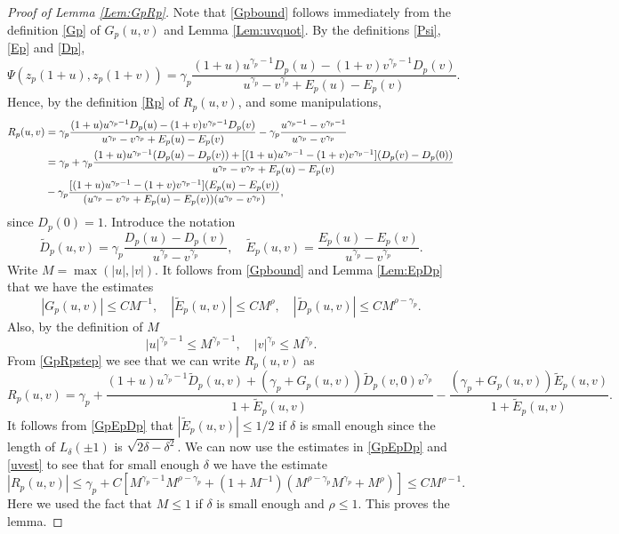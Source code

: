 \documentclass{article}
\numberwithin{equation}{section}
\numberwithin{figure}{section}
\theoremstyle{plain}
\theoremstyle{plain}
\numberwithin{thm}{section}
\theoremstyle{remark}
\let \le \leqslant
\begin{document}
\begin{proof}[Proof of Lemma \ref{Lem:GpRp}]
Note that \eqref{Gpbound} follows immediately from the definition \eqref{Gp} of $G_p(u,v)$ and Lemma \ref{Lem:uvquot}. By the definitions \eqref{Psi},
\eqref{Ep} and \eqref{Dp},
\begin{equation*}
\Psi(z_p(1+u),z_p(1+v))=\gamma_p\frac{(1+u)u^{\gamma_p-1}D_p(u)-(1+v)v^{\gamma_p-1}D_p(v)}{u^{\gamma_p}-v^{\gamma_p}+E_p(u)-E_p(v)}.
\end{equation*}
Hence, by the definition \eqref{Rp} of $R_p(u,v)$, and some manipulations,
\begin{align}\label{GpRpstep}
R_p(u,v)&=\gamma_p\frac{(1+u)u^{\gamma_p-1}D_p(u)-(1+v)v^{\gamma_p-1}D_p(v)}{u^{\gamma_p}-v^{\gamma_p}+E_p(u)-E_p(v)}
-\gamma_p\frac{u^{\gamma_p-1}-v^{\gamma_p-1}}{u^{\gamma_p}-v^{\gamma_p}}\notag\\
&=\gamma_p+\gamma_p\frac{(1+u)u^{\gamma_p-1}(D_p(u)-D_p(v))+[(1+u)u^{\gamma_p-1}-(1+v)v^{\gamma_p-1}](D_p(v)-D_p(0))}{u^{\gamma_p}-v^{\gamma_p}+E_p(u)-E_p(v)}
\notag\\
&-\gamma_p\frac{[(1+u)u^{\gamma_p-1}-(1+v)v^{\gamma_p-1}](E_p(u)-E_p(v))}{(u^{\gamma_p}-v^{\gamma_p}+E_p(u)-E_p(v))(u^{\gamma_p}-v^{\gamma_p})},
\end{align}
since $D_p(0)=1$. Introduce the notation
\begin{equation*}
\tilde{D}_p(u,v)=\gamma_p\frac{D_p(u)-D_p(v)}{u^{\gamma_p}-v^{\gamma_p}},\quad \tilde{E}_p(u,v)=\frac{E_p(u)-E_p(v)}{u^{\gamma_p}-v^{\gamma_p}}.
\end{equation*}
Write $M=\max(|u|,|v|)$. It follows from \eqref{Gpbound} and Lemma \ref{Lem:EpDp} that we have the estimates
\begin{equation}\label{GpEpDp}
|G_p(u,v)|\le CM^{-1},\quad |\tilde{E}_p(u,v)|\le CM^{\rho}, \quad |\tilde{D}_p(u,v)|\le CM^{\rho-\gamma_p}.
\end{equation}
Also, by the definition of $M$
\begin{equation}\label{uvest}
|u|^{\gamma_p-1}\le M^{\gamma_p-1}, \quad |v|^{\gamma_p}\le M^{\gamma_p}.
\end{equation}
From \eqref{GpRpstep} we see that we can write $R_p(u,v)$ as
\begin{equation*}
R_p(u,v)=\gamma_p+\frac{(1+u)u^{\gamma_p-1}\tilde{D}_p(u,v)+(\gamma_p+G_p(u,v))\tilde{D}_p(v,0)v^{\gamma_p}}{1+\tilde{E}_p(u,v)}
-\frac{(\gamma_p+G_p(u,v))\tilde{E}_p(u,v)}{1+\tilde{E}_p(u,v)}.
\end{equation*}
It follows from \eqref{GpEpDp} that $|\tilde{E}_p(u,v)|\le 1/2$ if $\delta$ is small enough since the length of $L_\delta(\pm 1)$ is $\sqrt{2\delta-\delta^2}$. We
can now use the estimates in \eqref{GpEpDp} and \eqref{uvest} to see that for small enough $\delta$ we have the estimate
\begin{equation*}
|R_p(u,v)|\le \gamma_p+C[M^{\gamma_p-1}M^{\rho-\gamma_p}+(1+M^{-1})(M^{\rho-\gamma_p}M^{\gamma_p}+M^\rho)]\le CM^{\rho-1}.
\end{equation*}
Here we used the fact that $M\le 1$ if $\delta$ is small enough and $\rho\le 1$. This proves the lemma.
\end{proof}
\end{document}

